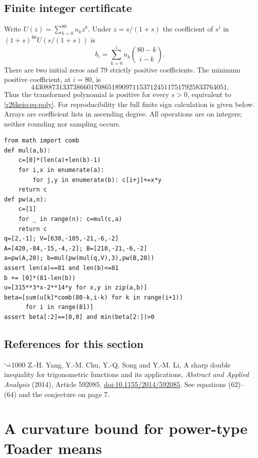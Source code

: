 \documentclass[11pt,a4paper]{article}
\makeatletter
\numberwithin{equation}{section}
\theoremstyle{definition}
\theoremstyle{remark}
\renewenvironment{thebibliography}[1]
 {\subsection*{References for this section}\small
  \list{\@biblabel{\@arabic\c@enumiv}}
       {\settowidth\labelwidth{\@biblabel{#1}}\leftmargin\labelwidth
        \advance\leftmargin\labelsep\@openbib@code
        \usecounter{enumiv}\let\p@enumiv\@empty
        \renewcommand\theenumiv{\@arabic\c@enumiv}}
  \sloppy\clubpenalty4000\widowpenalty4000\sfcode`\.=1000\relax}
 {\def\@noitemerr{\@latex@warning{Empty bibliography}}\endlist}
\makeatother
\begin{document}
\subsection{Finite integer certificate}
Write $U(z)=\sum_{k=0}^{80}u_kz^k$. Under $z=s/(1+s)$ the coefficient of $s^i$ in $(1+s)^{80}U(s/(1+s))$ is
\[
 b_i=\sum_{k=0}^i u_k \binom{80-k}{i-k}.
\]
There are two initial zeros and 79 strictly positive coefficients. The minimum positive coefficient, at $i=80$, is
\[
 44308873133738660170865189097115371245117517925833764051.
\]
Thus the transformed polynomial is positive for every $s>0$, equivalent to \eqref{r26keio:eq:poly}. For reproducibility the full finite sign calculation is given below. Arrays are coefficient lists in ascending degree. All operations are on integers; neither rounding nor sampling occurs.
\begin{Verbatim}[fontsize=\small,breaklines=true,breakanywhere=true]
from math import comb
def mul(a,b):
    c=[0]*(len(a)+len(b)-1)
    for i,x in enumerate(a):
        for j,y in enumerate(b): c[i+j]+=x*y
    return c
def pw(a,n):
    c=[1]
    for _ in range(n): c=mul(c,a)
    return c
q=[2,-1]; V=[630,-105,-21,-6,-2]
A=[420,-84,-15,-4,-2]; B=[210,-21,-6,-2]
a=pw(A,20); b=mul(pw(mul(q,V),3),pw(B,20))
assert len(a)==81 and len(b)<=81
b += [0]*(81-len(b))
u=[315**3*x-2**14*y for x,y in zip(a,b)]
beta=[sum(u[k]*comb(80-k,i-k) for k in range(i+1))
      for i in range(81)]
assert beta[:2]==[0,0] and min(beta[2:])>0
\end{Verbatim}


\begin{thebibliography}{1}
 Z.-H. Yang, Y.-M. Chu, Y.-Q. Song and Y.-M. Li,
A sharp double inequality for trigonometric functions and its applications,
\emph{Abstract and Applied Analysis} (2014), Article 592085,
\href{https://doi.org/10.1155/2014/592085}{doi:10.1155/2014/592085}.
See equations (62)--(64) and the conjecture on page 7.
\end{thebibliography}

\par\endgroup

\begingroup

\section{\texorpdfstring{A curvature bound for power-type Toader means}{A curvature bound for power-type Toader means}}\label{section:r27meiji}
\par\medskip
\end{document}
